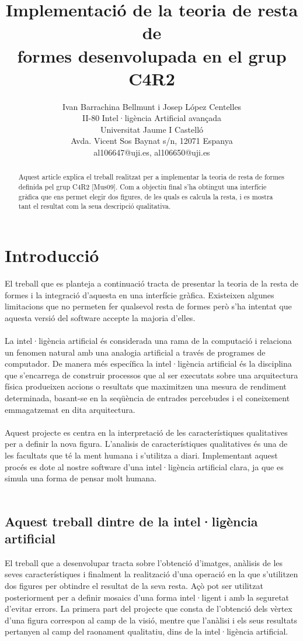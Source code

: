 \documentclass{article}
\title{Implementació de la teoria de resta de\\formes desenvolupada en el grup C4R2}
\author{Ivan Barrachina Bellmunt i Josep López Centelles\\
II-80 Intel·ligència Artificial avançada\\
Universitat Jaume I Castelló\\
Avda. Vicent Sos Baynat s/n, 12071 Espanya \\
al106647@uji.es, al106650@uji.es}
\begin{document}
\maketitle

\begin{abstract}
Aquest article explica el treball realitzat per a implementar la teoria de resta de formes definida pel grup C4R2 [Mus09].
Com a objectiu final s'ha obtingut una interfície gràfica que ens permet elegir dos figures, de les quals es calcula la resta, i es mostra tant el resultat com la seua descripció qualitativa.
\end{abstract}

\section{Introducció}
El treball que es planteja a continuació tracta de presentar la teoria de la resta de formes i la integració d'aquesta en una interfície gràfica.
Existeixen algunes limitacions que no permeten fer qualsevol resta de formes però s'ha intentat que aquesta versió del software accepte la majoria d'elles.
\\
\\
La intel·ligència artificial és considerada una rama de la computació i relaciona un fenomen natural amb una analogia artificial a través de programes de computador.
De manera més específica la intel·ligència artificial és la disciplina que s'encarrega de construir processos que al ser executats sobre una arquitectura física produeixen accions o resultats que maximitzen una mesura de rendiment determinada, basant-se en la seqüència de entrades percebudes i el coneixement emmagatzemat en dita arquitectura.
\\
\\
Aquest projecte es centra en la interpretació de les característiques qualitatives per a definir la nova figura.
L'analisis de característiques qualitatives és una de les facultats que té la ment humana i s'utilitza a diari.
Implementant aquest procés es dote al nostre software d'una intel·ligència artificial clara, ja que es simula una forma de pensar molt humana.
\\
\\
\subsection{Aquest treball dintre de la intel·ligència artificial}
El treball que a desenvolupar tracta sobre l'obtenció d'imatges, anàlisis de les seves característiques i finalment la realització d'una operació en la que s'utilitzen dos figures per obtindre el resultat de la seva resta.
Açò pot ser utilitzat posteriorment per a definir mosaics d'una forma intel·ligent i amb la seguretat d'evitar errors.
La primera part del projecte que consta de l'obtenció dels vèrtex d'una figura correspon al camp de la visió, mentre que l'anàlisi i els seus resultats pertanyen al camp del raonament qualitatiu, dins de la intel·ligència artificial.
\\
\end{document}
